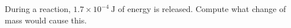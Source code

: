 During a reaction, $1.7 \times 10^{-4}\ \mathrm{J}$ of energy is released. 
Compute what change of mass would cause this.